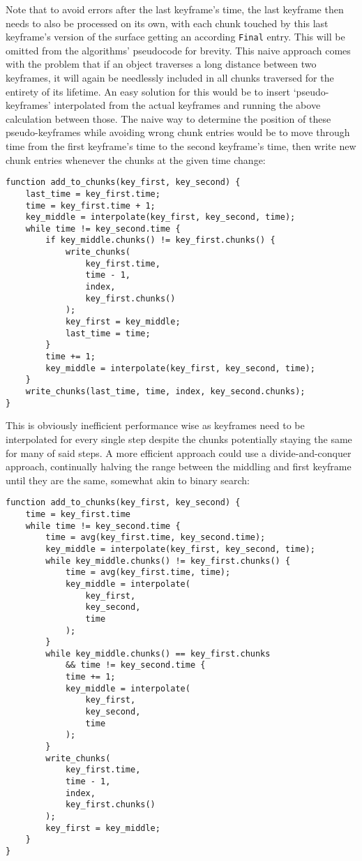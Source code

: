 Note that to avoid errors after the last keyframe's time,
the last keyframe then needs to also be processed on its own,
with each chunk touched by this last keyframe's version of the surface getting an according \verb|Final| entry.
This will be omitted from the algorithms' pseudocode for brevity.
\newline
This naive approach comes with the problem that if an object traverses a long distance between two keyframes,
it will again be needlessly included in all chunks traversed for the entirety of its lifetime.
An easy solution for this would be to insert `pseudo-keyframes' interpolated from the actual keyframes
and running the above calculation between those.
\newline
The naive way to determine the position of these pseudo-keyframes while avoiding wrong chunk entries
would be to move through time from the first keyframe's time to the second keyframe's time,
then write new chunk entries whenever the chunks at the given time change:

\begin{verbatim}
function add_to_chunks(key_first, key_second) {
    last_time = key_first.time;
    time = key_first.time + 1;
    key_middle = interpolate(key_first, key_second, time);
    while time != key_second.time {
        if key_middle.chunks() != key_first.chunks() {
            write_chunks(
                key_first.time,
                time - 1,
                index,
                key_first.chunks()
            );
            key_first = key_middle;
            last_time = time;
        }
        time += 1;
        key_middle = interpolate(key_first, key_second, time);
    }
    write_chunks(last_time, time, index, key_second.chunks);
}
\end{verbatim}

This is obviously inefficient performance wise as keyframes need to be interpolated for every single step
despite the chunks potentially staying the same for many of said steps.
A more efficient approach could use a divide-and-conquer approach,
continually halving the range between the middling and first keyframe until they are the same,
somewhat akin to binary search:

\begin{verbatim}
function add_to_chunks(key_first, key_second) {
    time = key_first.time
    while time != key_second.time {
        time = avg(key_first.time, key_second.time);
        key_middle = interpolate(key_first, key_second, time);
        while key_middle.chunks() != key_first.chunks() {
            time = avg(key_first.time, time);
            key_middle = interpolate(
                key_first,
                key_second,
                time
            );
        }
        while key_middle.chunks() == key_first.chunks
            && time != key_second.time {
            time += 1;
            key_middle = interpolate(
                key_first,
                key_second,
                time
            );
        }
        write_chunks(
            key_first.time, 
            time - 1, 
            index,
            key_first.chunks()
        );
        key_first = key_middle;
    }
}
\end{verbatim}

